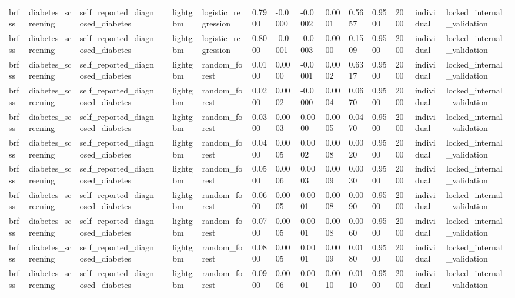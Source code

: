 \begin{tabular}{lllllllllllllll}
brfss & diabetes\_screening & self\_reported\_diagnosed\_diabetes &  & lightgbm & logistic\_regression & 0.7900 & -0.0000 & -0.0002 & 0.0001 & 0.5657 & 0.9500 & 2000 & individual & locked\_internal\_validation \\
brfss & diabetes\_screening & self\_reported\_diagnosed\_diabetes &  & lightgbm & logistic\_regression & 0.8000 & -0.0001 & -0.0003 & 0.0000 & 0.1509 & 0.9500 & 2000 & individual & locked\_internal\_validation \\
brfss & diabetes\_screening & self\_reported\_diagnosed\_diabetes &  & lightgbm & random\_forest & 0.0100 & 0.0000 & -0.0001 & 0.0002 & 0.6317 & 0.9500 & 2000 & individual & locked\_internal\_validation \\
brfss & diabetes\_screening & self\_reported\_diagnosed\_diabetes &  & lightgbm & random\_forest & 0.0200 & 0.0002 & -0.0000 & 0.0004 & 0.0670 & 0.9500 & 2000 & individual & locked\_internal\_validation \\
brfss & diabetes\_screening & self\_reported\_diagnosed\_diabetes &  & lightgbm & random\_forest & 0.0300 & 0.0003 & 0.0000 & 0.0005 & 0.0470 & 0.9500 & 2000 & individual & locked\_internal\_validation \\
brfss & diabetes\_screening & self\_reported\_diagnosed\_diabetes &  & lightgbm & random\_forest & 0.0400 & 0.0005 & 0.0002 & 0.0008 & 0.0020 & 0.9500 & 2000 & individual & locked\_internal\_validation \\
brfss & diabetes\_screening & self\_reported\_diagnosed\_diabetes &  & lightgbm & random\_forest & 0.0500 & 0.0006 & 0.0003 & 0.0009 & 0.0030 & 0.9500 & 2000 & individual & locked\_internal\_validation \\
brfss & diabetes\_screening & self\_reported\_diagnosed\_diabetes &  & lightgbm & random\_forest & 0.0600 & 0.0005 & 0.0001 & 0.0008 & 0.0090 & 0.9500 & 2000 & individual & locked\_internal\_validation \\
brfss & diabetes\_screening & self\_reported\_diagnosed\_diabetes &  & lightgbm & random\_forest & 0.0700 & 0.0005 & 0.0001 & 0.0008 & 0.0060 & 0.9500 & 2000 & individual & locked\_internal\_validation \\
brfss & diabetes\_screening & self\_reported\_diagnosed\_diabetes &  & lightgbm & random\_forest & 0.0800 & 0.0005 & 0.0001 & 0.0009 & 0.0180 & 0.9500 & 2000 & individual & locked\_internal\_validation \\
brfss & diabetes\_screening & self\_reported\_diagnosed\_diabetes &  & lightgbm & random\_forest & 0.0900 & 0.0006 & 0.0001 & 0.0010 & 0.0110 & 0.9500 & 2000 & individual & locked\_internal\_validation \\

\end{tabular}
